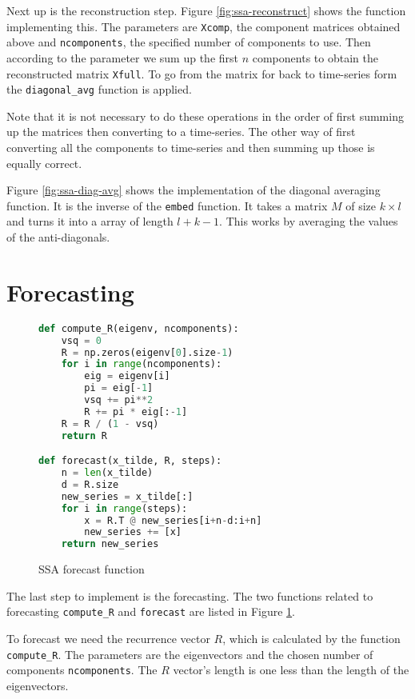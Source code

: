 Next up is the reconstruction step. Figure \ref{fig:ssa-reconstruct} shows the function implementing this. The parameters are \texttt{Xcomp}, the component matrices obtained above and \texttt{ncomponents}, the specified number of components to use. Then according to the parameter we sum up the first $n$ components to obtain the reconstructed matrix \texttt{Xfull}. To go from the matrix for back to time-series form the \texttt{diagonal\_avg} function is applied. 

Note that it is not necessary to do these operations in the order of first summing up the matrices then converting to a time-series. The other way of first converting all the components to time-series and then summing up those is equally correct. 

Figure \ref{fig:ssa-diag-avg} shows the implementation of the diagonal averaging function. It is the inverse of the \texttt{embed} function. It takes a matrix $M$ of size $k \times l$ and turns it into a array of length $l+k-1$. This works by averaging the values of the anti-diagonals. 

\section{Forecasting}

\begin{figure}
\begin{singlespace}
\begin{lstlisting}[language=Python]
def compute_R(eigenv, ncomponents):
    vsq = 0
    R = np.zeros(eigenv[0].size-1)
    for i in range(ncomponents):
        eig = eigenv[i]
        pi = eig[-1]
        vsq += pi**2
        R += pi * eig[:-1]
    R = R / (1 - vsq)
    return R

def forecast(x_tilde, R, steps):
    n = len(x_tilde)
    d = R.size
    new_series = x_tilde[:]
    for i in range(steps):
        x = R.T @ new_series[i+n-d:i+n]
        new_series += [x]
    return new_series
\end{lstlisting}
\end{singlespace}
\caption{SSA forecast function}    
\label{fig:ssa-forecast}
\end{figure}

The last step to implement is the forecasting. The two functions related to forecasting \texttt{compute\_R} and \texttt{forecast} are listed in Figure \ref{fig:ssa-forecast}. 

To forecast we need the recurrence vector $R$, which is calculated by the function \texttt{compute\_R}. The parameters are the eigenvectors and the chosen number of components \texttt{ncomponents}. The $R$ vector's length is one less than the length of the eigenvectors. 

